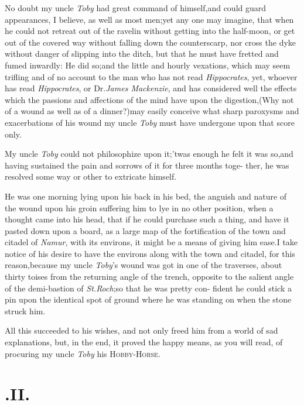 \documentclass{article}
\begin{document}
No doubt my uncle \textit{Toby} had great command of
himself,\tsk and could guard appearances, I believe, as well as
most men;\tsk yet any one may imagine, that when he could not
retreat out of the ravelin without getting into the half-moon,
or get out of the covered way without falling down the
counterscarp, nor cross the dyke without danger of slipping into
the ditch, but that he must have fretted and fumed inwardly:\tsk
He did so;\tsk and the little and hourly vexations, which may
seem trifling and of no account to the man who has not read
\textit{Hippocrates}, yet, whoever has read
\textit{Hippocrates}, or Dr.\@ \textit{James Mackenzie},
and has considered well the effects which the passions and
affections of the mind have upon the digestion,\tsk (Why not of a
wound as well as of a dinner?)\tsk may easily conceive what
sharp paroxysms and exacerbations of his wound my uncle
\textit{Toby} must have undergone upon that score only.

\tsk My uncle \textit{Toby} could not philoso\-phize upon
it;\tsk ’twas enough he felt it\break
was so,\tsk and having sustained the pain\break
and sorrows of it for three months toge- ther, he was resolved some
way or other to extricate himself.

He was one morning lying upon his back in his bed, the anguish and nature\break
of the wound upon his groin suffering him to lye in no other position, when a
thought came into his head, that if he could purchase such a thing, and have it
pasted down upon a board, as a large map of the fortification of the town and
citadel of \textit{Namur}, with its environs, it might be a means of giving him
ease.\tsk\break I take notice of his desire to have the environs along with the
town and cita\-del, for this reason,\tsk because my uncle \textit{Toby}’s
wound was got in one of the traverses, about thirty toises from the returning
angle of the trench, opposite to the salient angle of the demi-bastion of
\textit{St.\@ Roch};\tsh so that he was pretty con- fident he could stick a
pin upon the identical spot of ground where he was standing on when the stone
struck him.


All this succeeded to his wishes, and not only freed him from a
world of sad explanations, but, in the end, it proved the happy means, as you will read, of procuring my
uncle \textit{Toby} his \textsc{Hobby-}\break\textsc{Horse}.


\section{.\enspace  II.}
\end{document}
